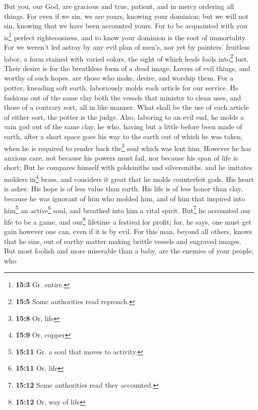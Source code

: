  But you, our God, are gracious and true, patient, and in
mercy ordering all things.  For even if we sin, we are
yours, knowing your dominion; but we will not sin, knowing that we have
been accounted yours.  For to be acquainted with you
is\footnote{\textbf{15:3} Gr. entire.} perfect righteousness, and to
know your dominion is the root of immortality.  For we
weren't led astray by any evil plan of men's, nor yet by painters'
fruitless labor, a form stained with varied colors,  the
sight of which leads fools into\footnote{\textbf{15:5} Some authorities
  read reproach.} lust. Their desire is for the breathless form of a
dead image.  Lovers of evil things, and worthy of such
hopes, are those who make, desire, and worship them.  For
a potter, kneading soft earth, laboriously molds each article for our
service. He fashions out of the same clay both the vessels that minister
to clean uses, and those of a contrary sort, all in like manner. What
shall be the use of each article of either sort, the potter is the
judge.  Also, laboring to an evil end, he molds a vain god
out of the same clay, he who, having but a little before been made of
earth, after a short space goes his way to the earth out of which he was
taken, when he is required to render back the\footnote{\textbf{15:8} Or,
  life} soul which was lent him.  However he has anxious
care, not because his powers must fail, nor because his span of life is
short; But he compares himself with goldsmiths and silversmiths, and he
imitates molders in\footnote{\textbf{15:9} Or, copper} brass, and
considers it great that he molds counterfeit gods.  His
heart is ashes. His hope is of less value than earth. His life is of
less honor than clay,  because he was ignorant of him who
molded him, and of him that inspired into him\footnote{\textbf{15:11}
  Gr. a soul that moves to activity.} an active\footnote{\textbf{15:11}
  Or, life} soul, and breathed into him a vital spirit. 
But\footnote{\textbf{15:12} Some authorities read they accounted.} he
accounted our life to be a game, and our\footnote{\textbf{15:12} Or, way
  of life} lifetime a festival for profit; for, he says, one must get
gain however one can, even if it is by evil.  For this
man, beyond all others, knows that he sins, out of earthy matter making
brittle vessels and engraved images.  But most foolish
and more miserable than a baby, are the enemies of your people, who
